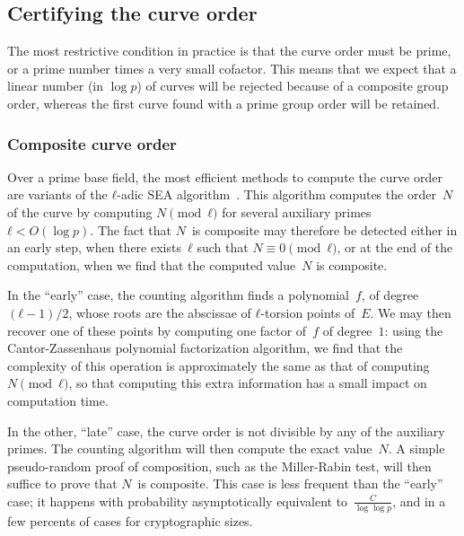 \documentclass[twocolumn,letterpaper]{article}
\begin{document}
\subsection{Certifying the curve order}

The most restrictive condition in practice is that
the curve order must be prime, or a prime number
times a very small cofactor.
This means that we expect that a linear number (in $\log p$)
of curves will be rejected because of a composite group order,
whereas the first curve found with a prime group order
will be retained.

\subsubsection{Composite curve order}

Over a prime base field,
the most efficient methods to compute the curve order are
variants of the $ℓ$-adic SEA algorithm~\cite{mathcomp1985schoof,
jtnb1995schoof,smf2008cl}.
This algorithm computes the order~$N$ of the curve
by computing $N \pmod{ℓ}$ for several
auxiliary primes~$ℓ < O(\log p)$.
The fact that $N$~is composite may therefore be detected
either in an early step,
when there exists~$ℓ$ such that $N ≡ 0 \pmod{ℓ}$,
or at the end of the computation,
when we find that the computed value~$N$ is composite.

In the “early” case,
the counting algorithm finds a polynomial~$f$, of degree~$(ℓ-1)/2$,
whose roots are the abscissae of $ℓ$-torsion points of~$E$.
We may then recover one of these points by
computing one factor of~$f$ of degree~$1$:
using the Cantor-Zassenhaus polynomial factorization algorithm,
we find that the complexity of this operation
is approximately the same as that of computing~$N \pmod{ℓ}$,
so that computing this extra information
has a small impact on computation time.

\smallskip

In the other, “late” case, the curve order is not divisible
by any of the auxiliary primes.
The counting algorithm will then compute the exact value~$N$.
A simple pseudo-random proof of composition,
such as the Miller-Rabin test,
will then suffice to prove that $N$~is composite.
This case is less frequent than the “early” case;
it happens with probability
asymptotically equivalent to~$\frac{C}{\log \log p}$,
and in a few percents of cases for cryptographic sizes.

\smallskip
\end{document}
